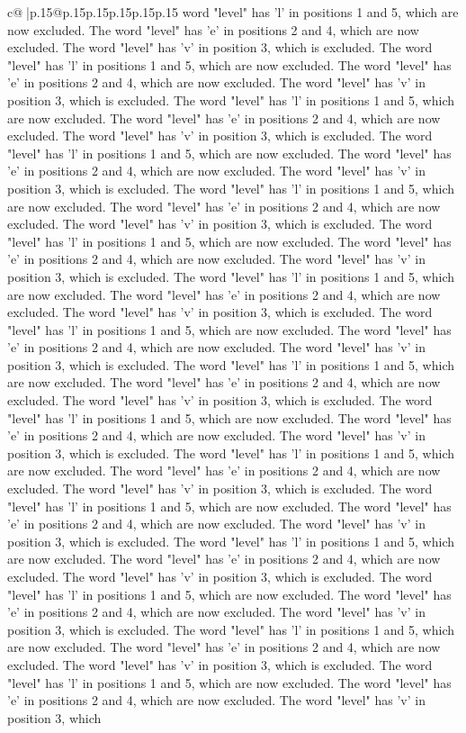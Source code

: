 \documentclass{article}
\begin{document}
{\begin{supertabular}{c@{$\;$}|p{.15\linewidth}@{}p{.15\linewidth}p{.15\linewidth}p{.15\linewidth}p{.15\linewidth}p{.15\linewidth}}
{{{word "level" has 'l' in positions 1 and 5, which are now excluded. The word "level" has 'e' in positions 2 and 4, which are now excluded. The word "level" has 'v' in position 3, which is excluded. The word "level" has 'l' in positions 1 and 5, which are now excluded. The word "level" has 'e' in positions 2 and 4, which are now excluded. The word "level" has 'v' in position 3, which is excluded. The word "level" has 'l' in positions 1 and 5, which are now excluded. The word "level" has 'e' in positions 2 and 4, which are now excluded. The word "level" has 'v' in position 3, which is excluded. The word "level" has 'l' in positions 1 and 5, which are now excluded. The word "level" has 'e' in positions 2 and 4, which are now excluded. The word "level" has 'v' in position 3, which is excluded. The word "level" has 'l' in positions 1 and 5, which are now excluded. The word "level" has 'e' in positions 2 and 4, which are now excluded. The word "level" has 'v' in position 3, which is excluded. The word "level" has 'l' in positions 1 and 5, which are now excluded. The word "level" has 'e' in positions 2 and 4, which are now excluded. The word "level" has 'v' in position 3, which is excluded. The word "level" has 'l' in positions 1 and 5, which are now excluded. The word "level" has 'e' in positions 2 and 4, which are now excluded. The word "level" has 'v' in position 3, which is excluded. The word "level" has 'l' in positions 1 and 5, which are now excluded. The word "level" has 'e' in positions 2 and 4, which are now excluded. The word "level" has 'v' in position 3, which is excluded. The word "level" has 'l' in positions 1 and 5, which are now excluded. The word "level" has 'e' in positions 2 and 4, which are now excluded. The word "level" has 'v' in position 3, which is excluded. The word "level" has 'l' in positions 1 and 5, which are now excluded. The word "level" has 'e' in positions 2 and 4, which are now excluded. The word "level" has 'v' in position 3, which is excluded. The word "level" has 'l' in positions 1 and 5, which are now excluded. The word "level" has 'e' in positions 2 and 4, which are now excluded. The word "level" has 'v' in position 3, which is excluded. The word "level" has 'l' in positions 1 and 5, which are now excluded. The word "level" has 'e' in positions 2 and 4, which are now excluded. The word "level" has 'v' in position 3, which is excluded. The word "level" has 'l' in positions 1 and 5, which are now excluded. The word "level" has 'e' in positions 2 and 4, which are now excluded. The word "level" has 'v' in position 3, which is excluded. The word "level" has 'l' in positions 1 and 5, which are now excluded. The word "level" has 'e' in positions 2 and 4, which are now excluded. The word "level" has 'v' in position 3, which is excluded. The word "level" has 'l' in positions 1 and 5, which are now excluded. The word "level" has 'e' in positions 2 and 4, which are now excluded. The word "level" has 'v' in position 3, which is excluded. The word "level" has 'l' in positions 1 and 5, which are now excluded. The word "level" has 'e' in positions 2 and 4, which are now excluded. The word "level" has 'v' in position 3, which }}}
\end{supertabular}}
\end{document}
